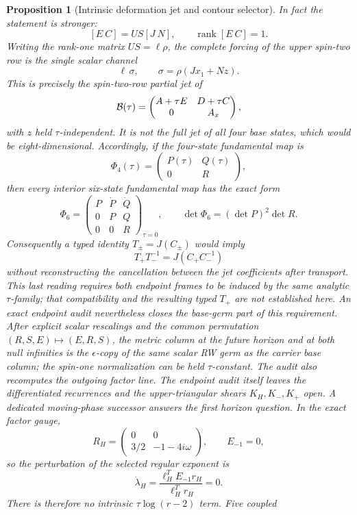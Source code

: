 \documentclass[11pt]{article}
\newtheorem{proposition}[theorem]{Proposition}
\theoremstyle{definition}
\theoremstyle{remark}
\begin{document}
\begin{proposition}[Intrinsic deformation jet and contour selector]
In fact the statement is stronger:
\[
 [E\ C]=US[J\ N],\qquad \operatorname{rank}[E\ C]=1.
\]
Writing the rank-one matrix \(US=\ell\rho\), the complete forcing of the
upper spin-two row is the single scalar channel
\[
 \ell\,\sigma,\qquad \sigma=\rho(Jx_1+Nz).
\]
This is precisely the spin-two-row partial jet of
\[
 {\cal B}(\tau)=
 \begin{pmatrix}A+\tau E&D+\tau C\\0&A_x\end{pmatrix},
\]
with \(z\) held \(\tau\)-independent.  It is not the full jet of all four
base states, which would be eight-dimensional.
Accordingly, if the four-state fundamental map is
\[
 \Phi_4(\tau)=
 \begin{pmatrix}P(\tau)&Q(\tau)\\0&R\end{pmatrix},
\]
then every interior six-state fundamental map has the exact form
\[
 \Phi_6=
 \begin{pmatrix}
 P&\dot P&\dot Q\\
 0&P&Q\\
 0&0&R
 \end{pmatrix}_{\tau=0},
 \qquad
 \det\Phi_6=(\det P)^2\det R.
\]
Consequently a typed identity \(T_\pm=J(C_\pm)\) would imply
\[
 T_+T_-^{-1}=J(C_+C_-^{-1})
\]
without reconstructing the cancellation between the jet coefficients after
transport.  This last reading requires both endpoint frames to be induced
by the same analytic \(\tau\)-family; that compatibility and the resulting
typed \(T_+\) are not established here.
An exact endpoint audit nevertheless closes the base-germ part of this
requirement.  After explicit scalar rescalings and the common permutation
\((R,S,E)\mapsto(E,R,S)\), the metric column at the future horizon and at
both null infinities is the \(\epsilon\)-copy of the same scalar RW germ as
the carrier base column; the spin-one normalization can be held
\(\tau\)-constant.  The audit also recomputes the outgoing factor line.
The endpoint audit itself leaves the differentiated recurrences and the
upper-triangular shears \(K_H,K_-,K_+\) open.  A dedicated moving-phase
successor answers the first horizon question.  In the exact factor gauge,
\[
 R_H=\begin{pmatrix}0&0\\[1mm]3/2&-1-4i\omega\end{pmatrix},
 \qquad E_{-1}=0,
\]
so the perturbation of the selected regular exponent is
\[
 \dot\lambda_H
 =\frac{\ell_H^TE_{-1}r_H}{\ell_H^Tr_H}=0.
\]
There is therefore no intrinsic \(\tau\log(r-2)\) term.  Five coupled

\end{proposition}
\end{document}
